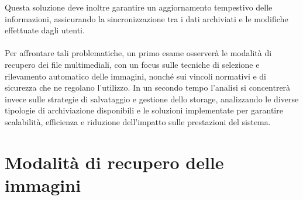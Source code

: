 Questa soluzione deve inoltre garantire un aggiornamento tempestivo delle informazioni, 
assicurando la sincronizzazione tra i dati archiviati e le modifiche effettuate dagli utenti.\\
\\
Per affrontare tali problematiche, 
un primo esame osserverà le modalità di recupero dei file multimediali,
con un focus sulle tecniche di selezione e rilevamento automatico delle immagini, 
nonché sui vincoli normativi e di sicurezza che ne regolano l'utilizzo.
In un secondo tempo l'analisi si concentrerà invece 
sulle strategie di salvataggio e gestione dello storage,
analizzando le diverse tipologie di archiviazione disponibili e le soluzioni implementate 
per garantire scalabilità, efficienza e riduzione dell'impatto sulle prestazioni del sistema.\\

\section{Modalità di recupero delle immagini }

